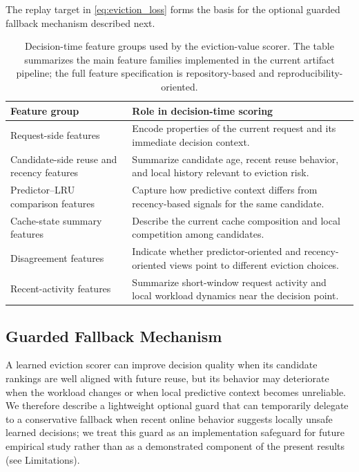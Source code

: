 \documentclass[preprint,12pt]{elsarticle}
\begin{document}
The replay target in \eqref{eq:eviction_loss} forms the basis for the optional guarded fallback mechanism described next.

\begin{table}[!htbp]
\centering
\caption{Decision-time feature groups used by the eviction-value scorer. The table summarizes the main feature families implemented in the current artifact pipeline; the full feature specification is repository-based and reproducibility-oriented.}
\label{tab:evict-value-feature-groups}
\small
\begin{tabular}{p{3.3cm} p{9.6cm}}
\toprule
Feature group & Role in decision-time scoring \\
\midrule
Request-side features & Encode properties of the current request and its immediate decision context. \\
Candidate-side reuse and recency features & Summarize candidate age, recent reuse behavior, and local history relevant to eviction risk. \\
Predictor--LRU comparison features & Capture how predictive context differs from recency-based signals for the same candidate. \\
Cache-state summary features & Describe the current cache composition and local competition among candidates. \\
Disagreement features & Indicate whether predictor-oriented and recency-oriented views point to different eviction choices. \\
Recent-activity features & Summarize short-window request activity and local workload dynamics near the decision point. \\
\bottomrule
\end{tabular}
\end{table}

\subsection{Guarded Fallback Mechanism}
\label{subsec:guarded_fallback_mechanism}

A learned eviction scorer can improve decision quality when its candidate rankings are well aligned with future reuse, but its behavior may deteriorate when the workload changes or when local predictive context becomes unreliable. We therefore describe a lightweight optional guard that can temporarily delegate to a conservative fallback when recent online behavior suggests locally unsafe learned decisions; we treat this guard as an implementation safeguard for future empirical study rather than as a demonstrated component of the present results (see Limitations).
\end{document}

